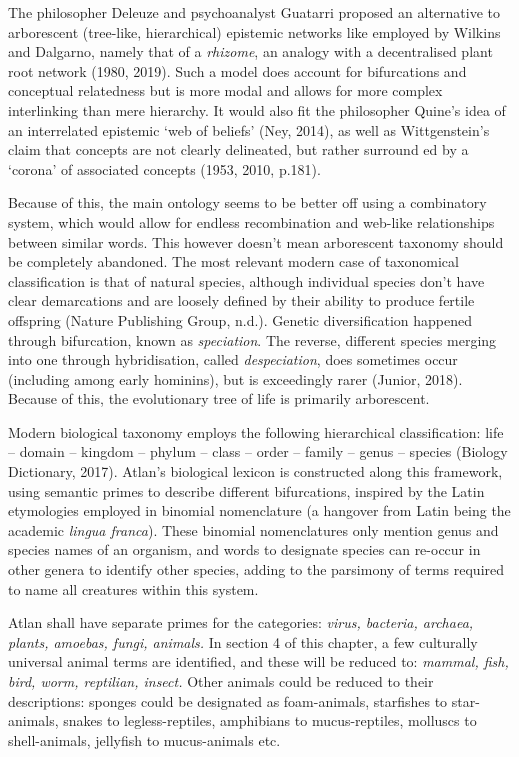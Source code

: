 The philosopher Deleuze and psychoanalyst Guatarri proposed an alternative to arborescent (tree-like, hierarchical) epistemic networks like employed by Wilkins and Dalgarno, namely that of a {\it rhizome}, an analogy with a decentralised plant root network (1980, 2019). Such a model does account for bifurcations and conceptual relatedness but is more modal and allows for more complex interlinking than mere hierarchy. It would also fit the philosopher Quine’s idea of an interrelated epistemic ‘web of beliefs’ (Ney, 2014), as well as Wittgenstein’s claim that concepts are not clearly delineated, but rather surround ed by a ‘corona’ of associated concepts (1953, 2010, p.181). 

Because of this, the main ontology seems to be better off using a combinatory system, which would allow for endless recombination and web-like relationships between similar words. This however doesn’t mean arborescent taxonomy should be completely abandoned. The most relevant modern case of taxonomical classification is that of natural species, although individual species don’t have clear demarcations and are loosely defined by their ability to produce fertile offspring (Nature Publishing Group, n.d.). Genetic diversification happened through bifurcation, known as {\it speciation}. The reverse, different species merging into one through hybridisation, called {\it despeciation}, does sometimes occur (including among early hominins), but is exceedingly rarer (Junior, 2018). Because of this, the evolutionary tree of life is primarily arborescent. 

Modern biological taxonomy employs the following hierarchical classification: life – domain – kingdom – phylum – class – order – family – genus – species (Biology Dictionary, 2017). Atlan’s biological lexicon is constructed along this framework, using semantic primes to describe different bifurcations, inspired by the Latin etymologies employed in binomial nomenclature (a hangover from Latin being the academic {\it lingua franca}). These binomial nomenclatures only mention genus and species names of an organism, and words to designate species can re-occur in other genera to identify other species, adding to the parsimony of terms required to name all creatures within this system. 

Atlan shall have separate primes for the categories: \textit{virus, bacteria, archaea, plants, amoebas, fungi, animals.} In section 4 of this chapter, a few culturally universal animal terms are identified, and these will be reduced to: \textit{mammal, fish, bird, worm, reptilian, insect.} Other animals could be reduced to their descriptions: sponges could be designated as foam-animals, starfishes to star-animals, snakes to legless-reptiles, amphibians to mucus-reptiles, molluscs to shell-animals, jellyfish to mucus-animals etc.  


